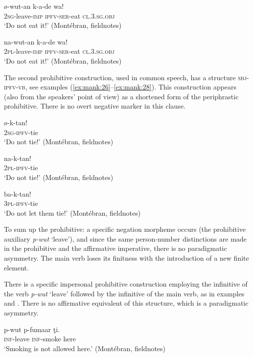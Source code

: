 \documentclass[output=paper,colorlinks,citecolor=brown]{langscibook}
\begin{document}
\ea\label{ex:mank:24}
    \gll ø-wut-an k-a-de wa!\\
         \textsc{2sg}-leave-\textsc{imp} \textsc{ipfv-ser-}eat \textsc{cl.3.sg.obj} \\ 
    \glt ‘Do not eat it!’ (Montébran, fieldnotes)
\z

\ea\label{ex:mank:25}
    \gll na-wut-an k-a-de wa!\\
         \textsc{2pl}-leave-\textsc{imp} \textsc{ipfv-ser}-eat \textsc{cl.3.sg.obj}\\
    \glt ‘Do not eat it!’ (Montébran, fieldnotes)
\z

The second prohibitive construction, used in common speech, has a structure \textsc{sbj-ipfv-vb}, see examples (\ref{ex:mank:26}--\ref{ex:mank:28}). This construction appears (also from the speakers’ point of view) as a shortened form of the periphrastic prohibitive. There is no overt negative marker in this clause.

\ea\label{ex:mank:26}
    \gll ø-k-tan!\\
         \textsc{2sg-ipfv}-tie \\
    \glt ‘Do not tie!’ (Montébran, fieldnotes)
\z

\ea\label{ex:mank:27}
    \gll na-k-tan!\\
         \textsc{2pl{}-ipfv}-tie \\
    \glt ‘Do not tie!’ (Montébran, fieldnotes)
\z

\ea\label{ex:mank:28}
    \gll ba-k-tan!\\
         \textsc{3pl-ipfv}-tie \\
    \glt ‘Do not let them tie!’ (Montébran, fieldnotes)
\z

To sum up the prohibitive: a specific negation morpheme occurs (the prohibitive auxiliary \textit{p-wut} ‘leave’),  and since the same person-number distinctions are made in the prohibitive and the affirmative imperative, there is no paradigmatic asymmetry.
The main verb loses its finitness with the introduction of a new finite element.

There is a specific impersonal prohibitive construction employing the infinitive of the verb \textit{p-wut} ‘leave’ followed by the infinitive of the main verb, as in examples  and . There is no affirmative equivalent of this structure, which is a paradigmatic asymmetry.

\ea\label{ex:mank:29}
    \gll p-wut p-fumaar ţi.\\
         \textsc{inf}-leave \textsc{inf}-smoke here\\
    \glt ‘Smoking is not allowed here.’ (Montébran, fieldnotes)
\z
\end{document}

